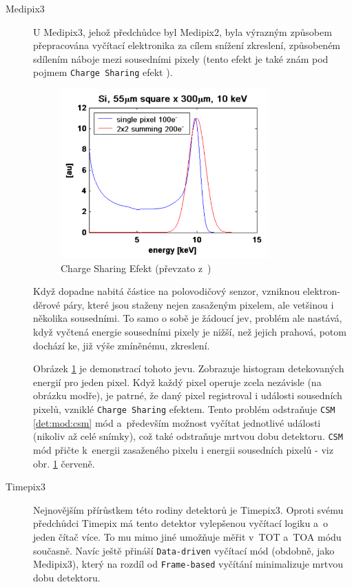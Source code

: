 \begin{description}
	\item[Medipix3] U Medipix3, jehož předchůdce byl Medipix2, byla výrazným způsobem přepracována vyčítací elektronika za cílem snížení zkreslení, způsobeném sdílením náboje mezi sousedními pixely (tento efekt je také znám pod pojmem \texttt{Charge Sharing} efekt \cite{Jakubek-radiography_and_charge_sharing}). 

	\begin{figure}[th]
	\begin{center}
		\includegraphics[width=8cm]{figures/det_charge_sharing.png}
		\caption{Charge Sharing Efekt (převzato z~\cite{medipix-www})}
		\label{fig:det:charge_sharing}
	\end{center}
	\end{figure}

	Když dopadne nabitá částice na polovodičový senzor, vzniknou elektron-děrové páry, které jsou staženy nejen zasaženým pixelem, ale vetšinou i několika sousedními. To samo o sobě je žádoucí jev, problém ale nastává, když vyčtená energie sousedními pixely je nižší, než jejich prahová, potom dochází ke, již výše zmíněnému, zkreslení. 
	
	Obrázek \ref{fig:det:charge_sharing} je demonstrací tohoto jevu. Zobrazuje histogram detekovaných energií pro jeden pixel. Když každý pixel operuje zcela nezávisle (na obrázku modře), je patrné, že daný pixel registroval i události sousedních pixelů, vzniklé \texttt{Charge Sharing} efektem. Tento problém odstraňuje \texttt{CSM} \ref{det:mod:csm} mód a~především možnost vyčítat jednotlivé události (nikoliv až celé snímky), což také odstraňuje mrtvou dobu detektoru. \texttt{CSM} mód přičte k~energii zasaženého pixelu i energii sousedních pixelů - viz obr. \ref{fig:det:charge_sharing} červeně.

	\item[Timepix3] Nejnovějším přírůstkem této rodiny detektorů je Timepix3. Oproti svému předchůdci Timepix má tento detektor vylepšenou vyčítací logiku a~o jeden čítač více. To mu mimo jiné umožňuje měřit v~TOT a~TOA módu současně. Navíc ještě přináší \texttt{Data-driven} vyčítací mód (obdobně, jako Medipix3), který na rozdíl od \texttt{Frame-based} vyčítání minimalizuje mrtvou dobu detektoru.

\end{description}

